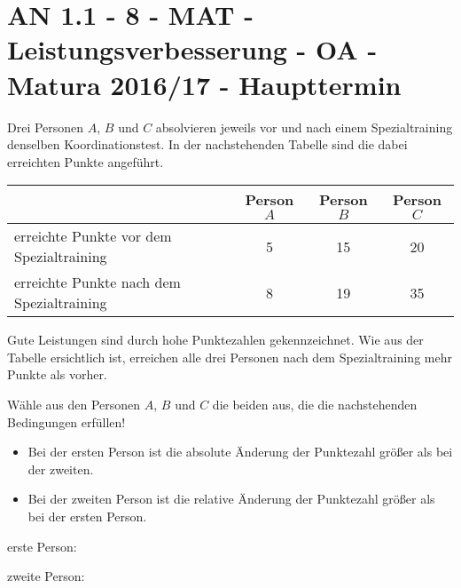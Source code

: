\section{AN 1.1 - 8 - MAT - Leistungsverbesserung - OA - Matura 2016/17 - Haupttermin}

\begin{beispiel}[AN 1.1]{1} %
Drei Personen $A$, $B$ und $C$ absolvieren jeweils vor und nach einem Spezialtraining denselben
Koordinationstest. In der nachstehenden Tabelle sind die dabei erreichten Punkte angeführt.

\begin{tabular}{|l|c|c|c|}\hhline{~|---}
\multicolumn{1}{c|}{}& \cellcolor{black!20} Person $A$ & \cellcolor{black!20}Person $B$ & \cellcolor{black!20}Person $C$ \\ \hline
\cellcolor{black!20}erreichte Punkte vor dem Spezialtraining & 5 & 15 & 20 \\ \hline
\cellcolor{black!20}erreichte Punkte nach dem Spezialtraining & 8 & 19 & 35 \\ \hline
\end{tabular}\leer

Gute Leistungen sind durch hohe Punktezahlen gekennzeichnet. Wie aus der Tabelle ersichtlich
ist, erreichen alle drei Personen nach dem Spezialtraining mehr Punkte als vorher. \leer

Wähle aus den Personen $A$, $B$ und $C$ die beiden aus, die die nachstehenden Bedingungen
erfüllen! 

\begin{itemize}
	\item Bei der ersten Person ist die absolute Änderung der Punktezahl größer als bei der zweiten.
	\item Bei der zweiten Person ist die relative Änderung der Punktezahl größer als bei der ersten Person.
\end{itemize}

erste Person: 

zweite Person: 
\end{beispiel}